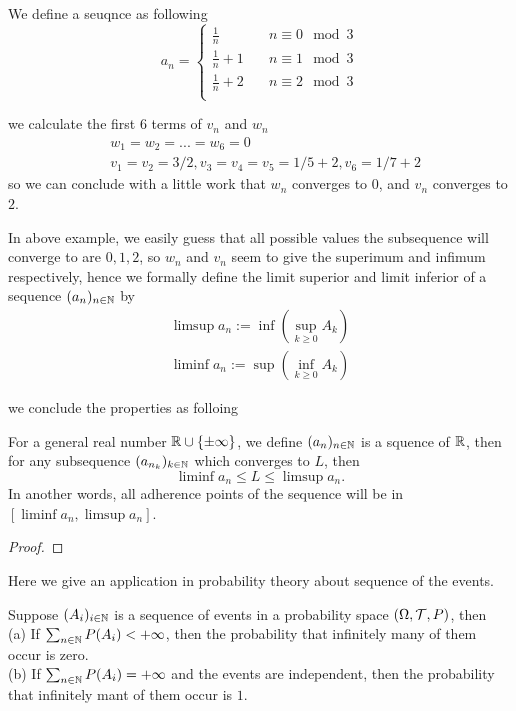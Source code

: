 \documentclass[en,geye,blue,pc,12pt]{elegantnote}
\begin{document}
\begin{example}
    We define a seuqnce as following
    \[a_n = \begin{cases}
        \frac{1}{n} \quad &n \equiv 0 \mod 3 \\
        \frac{1}{n}+1 \quad &n \equiv 1 \mod 3 \\
        \frac{1}{n}+2 \quad &n \equiv 2 \mod 3 \\
    \end{cases}\]

    we calculate the first 6 terms of \(v_n\) and \(w_n\)
    \begin{align*}
        &w_1 = w_2 = ... = w_6 = 0 \\
        &v_1 = v_2 = 3/2, v_3 = v_4 = v_5= 1/5+2, v_6 =1/7+2
    \end{align*}
    so we can conclude with a little work that \(w_n\) converges to \(0\), and \(v_n\) converges to \(2\). 
\end{example}
In above example, we easily guess that all possible values the subsequence will converge to are \(0,1,2\), so \(w_n\) and \(v_n\) seem to give the superimum and infimum respectively, hence we formally define the limit superior and limit inferior of a sequence \((a_n)_{n \in \mathbb{N}}\) by
\begin{align*}
    \limsup a_n := \inf (\sup_{k \geq 0} A_k) \\
    \liminf a_n := \sup (\inf_{k \geq 0} A_k)
\end{align*}

we conclude the properties as folloing
\begin{proposition}
    For a general real number \(\mathbb{R} \cup \{\pm \infty\}\), we define \((a_n)_{n \in \mathbb{N}}\) is a squence of \( \mathbb{R}\), then for any subsequence \((a_{n_k})_{k \in \mathbb{N}}\) which converges to \(L\), then 
    \[\liminf a_n  \leq L \leq \limsup a_n.\]
    In another words, all adherence points of the sequence will be in \([\liminf a_n,\limsup a_n ]\).

    \begin{proof}
        
    \end{proof}
\end{proposition}
 
Here we give an application in probability theory about sequence of the events.
\begin{theorem}
    Suppose \((A_i)_{i \in \mathbb{N}}\) is a sequence of events in a probability space \((\Omega ,\mathcal{T} ,P)\), then \\
    (a) If \(\sum_{n \in \mathbb{N}}P(A_i) < +\infty\), then the probability that infinitely many of them occur is zero.\\
    (b) If \(\sum_{n \in \mathbb{N}}P(A_i) = +\infty\) and the events are independent, then the probability that infinitely mant of them occur is \(1\).
\end{theorem}
\end{document}
